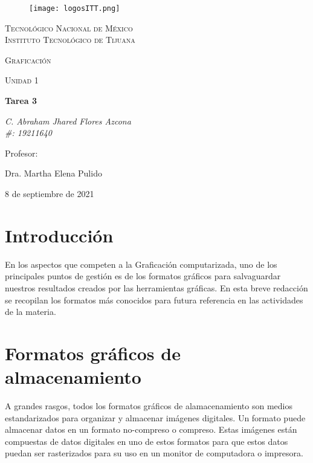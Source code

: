 \documentclass[letterpaper, 12pt]{article}
\begin{document}
    
    \begin{titlepage}
        \begin{figure}[ht]
            \centering
            \texttt{[image: logosITT.png]}
        \end{figure}
        \centering
        {\scshape\LARGE Tecnológico Nacional de México\\Instituto Tecnológico de Tijuana\par}
        \vspace{1cm}
        {\scshape\Large Graficación\par}
        \vspace{1cm}
        {\scshape\Large Unidad 1\par}
        \vspace{1.5cm}
        {\huge\bfseries Tarea 3\par}
        \vspace{2cm}
        {\Large\itshape C. Abraham Jhared Flores Azcona\\\#: 19211640\par}
        \vfill
        Profesor: \par
        Dra. Martha Elena Pulido
        
        \vfill

        {\large 8 de septiembre de 2021}
    \end{titlepage}

    \newpage
    \section*{Introducción}
    En los aspectos que competen a la Graficación computarizada, uno de los principales puntos de gestión es de los formatos gráficos para
    salvaguardar nuestros resultados creados por las herramientas gráficas. En esta breve redacción se recopilan los formatos más conocidos 
    para futura referencia en las actividades de la materia.\par
    \vspace{\baselineskip}
    \section*{Formatos gráficos de almacenamiento}
    A grandes rasgos, todos los formatos gráficos de alamacenamiento son medios estandarizados para organizar y almacenar imágenes digitales.
    Un formato puede almacenar datos en un formato no-compreso o compreso. Estas imágenes están compuestas de datos digitales en uno de estos formatos
    para que estos datos puedan ser rasterizados para su uso en un monitor de computadora o impresora.\par
    \vspace{\baselineskip}
\end{document}
